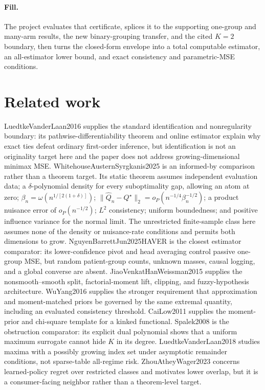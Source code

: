 \documentclass{article}
\begin{document}
\paragraph{Fill.} The project evaluates that certificate, splices it to the supporting one-group and many-arm results, the new binary-grouping transfer, and the cited \(K=2\) boundary, then turns the closed-form envelope into a total computable estimator, an all-estimator lower bound, and exact consistency and parametric-MSE conditions.

\section{Related work}

LuedtkeVanderLaan2016 supplies the standard identification and nonregularity boundary: its pathwise-differentiability theorem and online estimator explain why exact ties defeat ordinary first-order inference, but identification is not an originality target here and the paper does not address growing-dimensional minimax MSE. WhitehouseAusternSyrgkanis2025 is an informed-by comparison rather than a theorem target. Its static theorem assumes independent evaluation data; a \(\delta\)-polynomial density for every suboptimality gap, allowing an atom at zero; \(\beta_n=\omega(n^{1/[2(1+\delta)]})\); \(\lVert\widehat Q_n-Q^\star\rVert_2=o_P(n^{-1/4}\beta_n^{-1/2})\); a product nuisance error of \(o_P(n^{-1/2})\); \(L^2\) consistency; uniform boundedness; and positive influence variance for the normal limit. The unrestricted finite-sample class here assumes none of the density or nuisance-rate conditions and permits both dimensions to grow. NguyenBarrettJun2025HAVER is the closest estimator comparator: its lower-confidence pivot and head averaging control passive one-group MSE, but random patient-group counts, unknown masses, causal logging, and a global converse are absent. JiaoVenkatHanWeissman2015 supplies the nonsmooth--smooth split, factorial-moment lift, clipping, and fuzzy-hypothesis architecture. WuYang2016 supplies the stronger requirement that approximation and moment-matched priors be governed by the same extremal quantity, including an evaluated consistency threshold. CaiLow2011 supplies the moment-prior and chi-square template for a kinked functional. Spalek2008 is the obstruction comparator: its explicit dual polynomial shows that a uniform maximum surrogate cannot hide \(K\) in its degree. LuedtkeVanderLaan2018 studies maxima with a possibly growing index set under asymptotic remainder conditions, not sparse-table all-regime risk. ZhouAtheyWager2023 concerns learned-policy regret over restricted classes and motivates lower overlap, but it is a consumer-facing neighbor rather than a theorem-level target.
\end{document}
